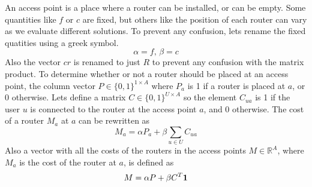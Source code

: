 \documentclass[11pt,a4paper]{article}
\newcommand*\mat[1]{ \begin{pmatrix} #1 \end{pmatrix}}
\begin{document}
An access point is a place where a router can be installed, or can be empty.  
Some quantities like $f$ or $c$ are fixed, but others like the position of each 
router can vary as we evaluate different solutions. To prevent any confusion, 
lets rename the fixed quatities using a greek symbol.
%
$$ \alpha = f,\, \beta = c $$
%
Also the vector $cr$ is renamed to just $R$ to prevent any confusion with the 
matrix product.
%
To determine whether or not a router should be placed at an access point, the 
column vector $P \in \{0,1\}^{1 \times A}$ where $P_a$ is 1 if a router is 
placed at $a$, or 0 otherwise.
%
%
Lets define a matrix $C \in \{0,1\}^{U \times A}$ so the element $C_{ua}$ is 1 
if the user $u$ is connected to the router at the access point $a$, and 0 
otherwise.
The cost of a router $M_a$ at $a$ can be rewritten as
%
$$ M_a = \alpha P_a + \beta \sum_{u \in U} C_{ua} $$
%
Also a vector with all the costs of the routers in the access points $M \in 
\mathbb{R}^{A}$, where $M_a$ is the cost of the router at $a$, is defined as
%
$$ M = \alpha P + \beta C^T \bf{1} $$
%
%
\end{document}
